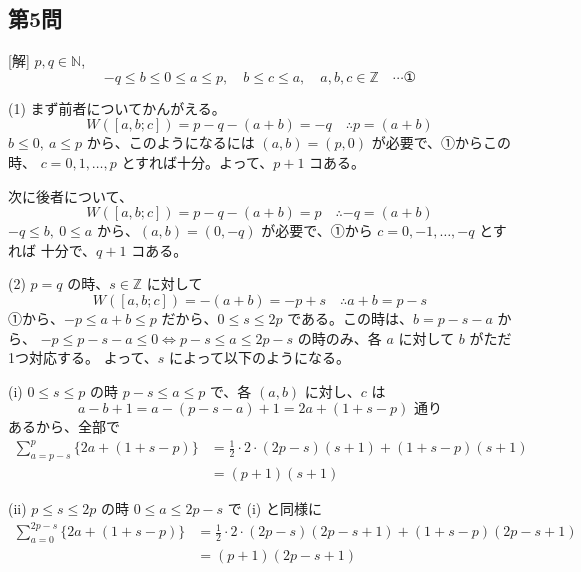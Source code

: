 \documentclass[../main.tex]{subfiles}
\begin{document}
\begin{center}
\end{center}

\subsection*{第5問}
[解] $p, q \in \mathbb{N}$,
\[ -q \le b \le 0 \le a \le p, \quad b \le c \le a, \quad a, b, c \in \mathbb{Z} \quad \cdots \text{①} \]

(1) まず前者についてかんがえる。
\[ W([a, b; c]) = p - q - (a+b) = -q \quad \therefore p = (a+b) \]
$b \le 0, \ a \le p$ から、このようになるには $(a, b) = (p, 0)$ が必要で、①からこの時、
$c = 0, 1, \dots, p$ とすれば十分。よって、$p+1$ コある。

次に後者について、
\[ W([a, b; c]) = p - q - (a+b) = p \quad \therefore -q = (a+b) \]
$-q \le b, \ 0 \le a$ から、$(a, b) = (0, -q)$ が必要で、①から $c = 0, -1, \dots, -q$ とすれば
十分で、$q+1$ コある。

(2) $p = q$ の時、$s \in \mathbb{Z}$ に対して
\[ W([a, b; c]) = -(a+b) = -p + s \quad \therefore a+b = p-s \]
①から、$-p \le a+b \le p$ だから、$0 \le s \le 2p$ である。この時は、$b = p-s-a$ から、
$-p \le p-s-a \le 0 \iff p-s \le a \le 2p-s$ の時のみ、各 $a$ に対して $b$ がただ1つ対応する。
よって、$s$ によって以下のようになる。

(i) $0 \le s \le p$ の時
$p-s \le a \le p$ で、各 $(a,b)$ に対し、$c$ は
\[ a - b + 1 = a - (p-s-a) + 1 = 2a + (1+s-p) \text{ 通り} \]
あるから、全部で
\begin{align*}
  \sum_{a=p-s}^{p} \{ 2a + (1+s-p) \} &= \frac{1}{2} \cdot 2 \cdot (2p-s)(s+1) + (1+s-p)(s+1) \\
  &= (p+1)(s+1)
\end{align*}

(ii) $p \le s \le 2p$ の時
$0 \le a \le 2p-s$ で (i) と同様に
\begin{align*}
  \sum_{a=0}^{2p-s} \{ 2a + (1+s-p) \} &= \frac{1}{2} \cdot 2 \cdot (2p-s)(2p-s+1) + (1+s-p)(2p-s+1) \\
  &= (p+1)(2p-s+1)
\end{align*}
\end{document}

